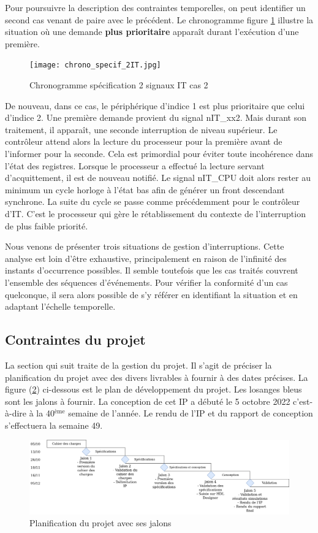 Pour poursuivre la description des contraintes temporelles, on peut identifier un second cas venant de paire avec le précédent.
Le chronogramme figure \ref{fig:spe_2IT} illustre la situation où une demande \textbf{plus prioritaire} apparaît durant l'exécution d'une première.
\begin{figure}[H]
	\centering
	\texttt{[image: chrono\_specif\_2IT.jpg]}
	\caption{Chronogramme spécification 2 signaux IT cas 2}
	\label{fig:spe_2IT}
\end{figure}
De nouveau, dans ce cas, le périphérique d'indice 1 est plus prioritaire que celui d'indice 2. 
Une première demande provient du signal nIT\_xx2.
Mais durant son traitement, il apparaît, une seconde interruption de niveau supérieur.
Le contrôleur attend alors la lecture du processeur pour la première avant de l'informer pour la seconde.
Cela est primordial pour éviter toute incohérence dans l'état des registres.
Lorsque le processeur a effectué la lecture servant d'acquittement, il est de nouveau notifié.
Le signal nIT\_CPU doit alors rester au minimum un cycle horloge à l'état bas afin de générer un front descendant synchrone.
La suite du cycle se passe comme précédemment pour le contrôleur d'IT.
C'est le processeur qui gère le rétablissement du contexte de l'interruption de plus faible priorité.

\gap
Nous venons de présenter trois situations de gestion d'interruptions. 
Cette analyse est loin d'être exhaustive, principalement en raison de l'infinité des instants d'occurrence possibles.
Il semble toutefois que les cas traités couvrent l'ensemble des séquences d'événements.
Pour vérifier la conformité d'un cas quelconque, il sera alors possible de s'y référer en identifiant la situation et en adaptant l'échelle temporelle.

\subsection{Contraintes du projet}

La section qui suit traite de la gestion du projet.
Il s'agit de préciser la planification du projet avec des divers livrables à fournir à des dates précises.
La figure (\ref{fig:planning}) ci-dessous est le plan de développement du projet.
Les losanges bleus sont les jalons à fournir.
La conception de cet IP a débuté le 5 octobre 2022 c'est-à-dire à la 40$^{\mbox{ème}}$ semaine de l'année.
Le rendu de l'IP et du rapport de conception s'effectuera la semaine 49.

\begin{figure}[H]
	\centering
	\includegraphics[width=1\linewidth]{figure/planning.png}
	\caption{Planification du projet avec ses jalons}
	\label{fig:planning}
\end{figure}

